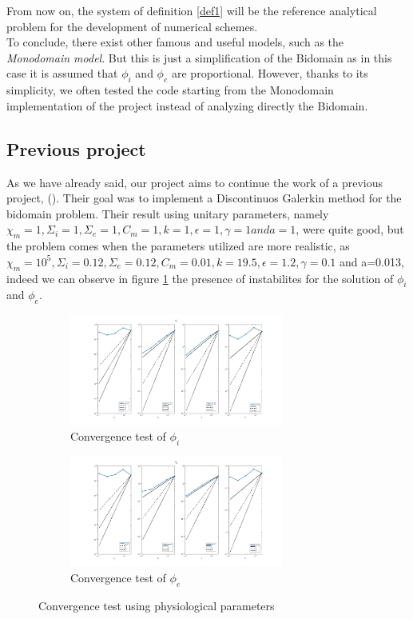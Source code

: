 \documentclass[a4paper,12pt]{article}
\begin{document}
    \vspace{4mm}
    \noindent From now on, the system of definition \ref{def1} will be the reference analytical problem for the development of numerical schemes.\\
    To conclude, there exist other famous and useful models, such as the \emph{Monodomain model}. But this is just a simplification of the Bidomain as in this case it is assumed that $\phi_i$ and $\phi_e$ are proportional. However, thanks to its simplicity, we often tested the code starting from the Monodomain implementation of the project \cite{andreotti} instead of analyzing directly the Bidomain.

\subsection{Previous project}
As we have already said, our project aims to continue the work of a previous project, \citeauthor{marta} (\parencite{marta}). Their goal was to implement a Discontinuos Galerkin method for the bidomain problem.\newline
Their result using unitary parameters, namely $\chi_m =1, \Sigma_i=1, \Sigma_e=1, C_m=1, k=1, \epsilon=1, \gamma=1 and a=1$, were quite good, but the problem comes when the parameters utilized are more realistic, as $\chi_m =10^5, \Sigma_i=0.12, \Sigma_e=0.12, C_m=0.01, k=19.5, \epsilon=1.2, \gamma=0.1$ and a=0.013, indeed we can observe in figure \ref{convergence_test_marta_fisio} the presence of instabilites for the solution of $\phi_i$ and $\phi_e$.
\begin{figure}[h]
\centering
         \begin{subfigure}[b]{0.5\textwidth}
    		\includegraphics[width = 7cm]{./phi_i_Marta_Perego.jpg}
    		\caption{Convergence test of $\phi_i$}
    	\end{subfigure}%
    	\hfill
     \begin{subfigure}[b]{0.5\textwidth}
    		\includegraphics[width = 7cm]{./phi_e_Marta_Perego.jpg}
    		\caption{Convergence test of $\phi_e$}
    	 \end{subfigure}
    	 \caption{Convergence test using physiological parameters}\label{convergence_test_marta_fisio}
\end{figure}
\end{document}
